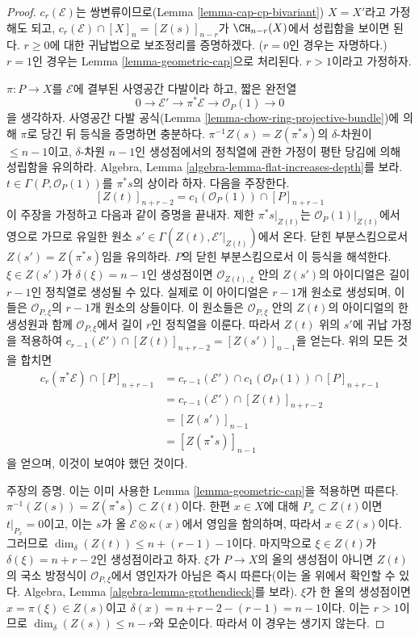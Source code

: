 \begin{proof}
$c_r(\mathcal{E})$는 쌍변류이므로(Lemma
\ref{lemma-cap-cp-bivariant}) $X = X'$라고 가정해도 되고,
$c_r(\mathcal{E}) \cap [X]_n = [Z(s)]_{n - r}$가
$\CH_{n - r}(X)$에서 성립함을 보이면 된다. $r \geq 0$에 대한
귀납법으로 보조정리를 증명하겠다. ($r = 0$인 경우는 자명하다.)
$r = 1$인 경우는 Lemma \ref{lemma-geometric-cap}으로 처리된다.
$r > 1$이라고 가정하자.

\medskip\noindent
$\pi : P \to X$를 $\mathcal{E}$에 결부된 사영공간 다발이라 하고,
짧은 완전열
$$
0 \to \mathcal{E}' \to \pi^*\mathcal{E} \to \mathcal{O}_P(1) \to 0
$$
을 생각하자. 사영공간 다발 공식(Lemma
\ref{lemma-chow-ring-projective-bundle})에 의해 $\pi$로 당긴 뒤
등식을 증명하면 충분하다.
$\pi^{-1}Z(s) = Z(\pi^*s)$의 $\delta$-차원이
$\leq n - 1$이고, $\delta$-차원 $n - 1$인 생성점에서의 정칙열에 관한
가정이 평탄 당김에 의해 성립함을 유의하라. Algebra, Lemma
\ref{algebra-lemma-flat-increases-depth}를 보라.
$t \in \Gamma(P, \mathcal{O}_P(1))$를 $\pi^*s$의 상이라 하자.
다음을 주장한다.
$$
[Z(t)]_{n + r - 2} = c_1(\mathcal{O}_P(1)) \cap [P]_{n + r - 1}
$$
이 주장을 가정하고 다음과 같이 증명을 끝내자. 제한
$\pi^*s|_{Z(t)}$는 $\mathcal{O}_P(1)|_{Z(t)}$에서 영으로 가므로 유일한
원소 $s' \in \Gamma(Z(t), \mathcal{E}'|_{Z(t)})$에서 온다.
닫힌 부분스킴으로서 $Z(s') = Z(\pi^*s)$임을 유의하라.
$P$의 닫힌 부분스킴으로서 이 등식을 해석한다.
$\xi \in Z(s')$가 $\delta(\xi) = n - 1$인 생성점이면
$\mathcal{O}_{Z(t), \xi}$ 안의 $Z(s')$의 아이디얼은 길이
$r - 1$인 정칙열로 생성될 수 있다. 실제로 이 아이디얼은
$r - 1$개 원소로 생성되며, 이들은 $\mathcal{O}_{P, \xi}$의
$r - 1$개 원소의 상들이다. 이
원소들은 $\mathcal{O}_{P, \xi}$ 안의 $Z(t)$의 아이디얼의 한 생성원과
함께 $\mathcal{O}_{P, \xi}$에서 길이 $r$인 정칙열을 이룬다. 따라서
$Z(t)$ 위의 $s'$에 귀납 가정을 적용하여
$c_{r - 1}(\mathcal{E}') \cap [Z(t)]_{n + r - 2} = [Z(s')]_{n - 1}$을
얻는다. 위의 모든 것을 합치면
\begin{align*}
c_r(\pi^*\mathcal{E}) \cap [P]_{n + r - 1}
& =
c_{r - 1}(\mathcal{E}') \cap c_1(\mathcal{O}_P(1)) \cap [P]_{n + r - 1} \\
& =
c_{r - 1}(\mathcal{E}') \cap [Z(t)]_{n + r - 2} \\
& =
[Z(s')]_{n - 1} \\
& = [Z(\pi^*s)]_{n - 1}
\end{align*}
을 얻으며, 이것이 보여야 했던 것이다.

\medskip\noindent
주장의 증명. 이는 이미 사용한 Lemma \ref{lemma-geometric-cap}을
적용하면 따른다. $\pi^{-1}(Z(s)) = Z(\pi^*s) \subset Z(t)$이다.
한편 $x \in X$에 대해 $P_x \subset Z(t)$이면
$t|_{P_x} = 0$이고, 이는 $s$가 올
$\mathcal{E} \otimes \kappa(x)$에서 영임을 함의하며, 따라서
$x \in Z(s)$이다. 그러므로
$\dim_\delta(Z(t)) \leq n + (r - 1) - 1$이다. 마지막으로
$\xi \in Z(t)$가 $\delta(\xi) = n + r - 2$인 생성점이라고 하자.
$\xi$가 $P \to X$의 올의 생성점이 아니면
$Z(t)$의 국소 방정식이 $\mathcal{O}_{P, \xi}$에서 영인자가 아님은
즉시 따른다(이는 올 위에서 확인할 수 있다. Algebra, Lemma
\ref{algebra-lemma-grothendieck}를 보라). $\xi$가 한 올의 생성점이면
$x = \pi(\xi) \in Z(s)$이고
$\delta(x) = n + r - 2 - (r - 1) = n - 1$이다. 이는 $r > 1$이므로
$\dim_\delta(Z(s)) \leq n - r$와 모순이다. 따라서 이 경우는 생기지
않는다.
\end{proof}

